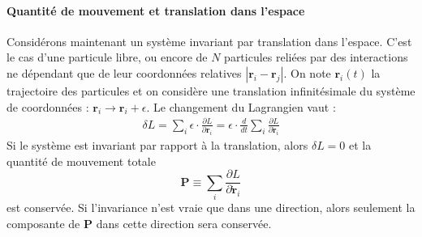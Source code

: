 \paragraph*{Quantité de mouvement et translation dans l'espace}
Considérons maintenant un système invariant par translation dans l'espace. C'est le cas d'une particule libre, ou encore de $N$ particules reliées par des interactions ne dépendant que de leur coordonnées relatives $\left|\bm{r}_i-\bm{r}_j\right|$. 
On note $\bm{r}_i(t)$ la trajectoire des particules et on considère une translation infinitésimale du système de coordonnées : $\bm{r}_i\rightarrow \bm{r}_i+\epsilon$. Le changement du Lagrangien vaut :
\begin{align*}
\delta L =\sum_i \epsilon\cdot\frac{\partial L}{\partial \bm{r}_i}= \epsilon\cdot\frac{d}{dt}\sum_i \frac{\partial L}{\partial {\dot{\bm{r}}}_i}
\end{align*}
Si le système est invariant par rapport à la translation, alors $\delta L=0$ et la quantité de mouvement totale
\begin{equation*}
\bm{P}\equiv\sum_i\frac{\partial L}{\partial \dot{\bm{r}}_i}
\end{equation*}
est conservée. Si l'invariance n'est vraie que dans une direction, alors seulement la composante de $\bm{P}$ dans cette direction sera conservée.


